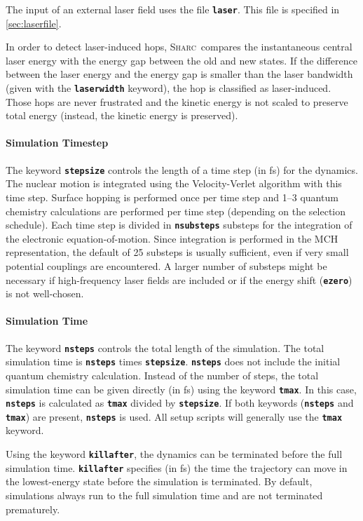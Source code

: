 \documentclass[a4paper,10pt,DIV=15,openany]{scrbook}
\newcommand{\sharc}{\textsc{Sharc}}
\newcommand{\ttt}[1]{\textbf{\texttt{#1}}}
\begin{document}
The input of an external laser field uses the file \ttt{laser}. This file is specified in \ref{sec:laserfile}.

In order to detect laser-induced hops, \sharc\ compares the instantaneous central laser energy with the energy gap between the old and new states. If the difference between the laser energy and the energy gap is smaller than the laser bandwidth (given with the \ttt{laserwidth} keyword), the hop is classified as laser-induced. Those hops are never frustrated and the kinetic energy is not scaled to preserve total energy (instead, the kinetic energy is preserved).

\paragraph{Simulation Timestep}

The keyword \ttt{stepsize} controls the length of a time step (in fs) for the dynamics. The nuclear motion is integrated using the Velocity-Verlet algorithm with this time step. Surface hopping is performed once per time step and 1--3 quantum chemistry calculations are performed per time step (depending on the selection schedule). Each time step is divided in \ttt{nsubsteps} substeps for the integration of the electronic equation-of-motion. Since integration is performed in the MCH representation, the default of 25 substeps is usually sufficient, even if very small potential couplings are encountered. A larger number of substeps might be necessary if high-frequency laser fields are included or if the energy shift (\ttt{ezero}) is not well-chosen.

\paragraph{Simulation Time}

The keyword \ttt{nsteps} controls the total length of the simulation. The total simulation time is \ttt{nsteps} times \ttt{stepsize}. \ttt{nsteps} does not include the initial quantum chemistry calculation. Instead of the number of steps, the total simulation time can be given directly (in fs) using the keyword \ttt{tmax}. In this case, \ttt{nsteps} is calculated as \ttt{tmax} divided by \ttt{stepsize}. If both keywords (\ttt{nsteps} and \ttt{tmax}) are present, \ttt{nsteps} is used. All setup scripts will generally use the \ttt{tmax} keyword.

Using the keyword \ttt{killafter}, the dynamics can be terminated before the full simulation time. \ttt{killafter} specifies (in fs) the time the trajectory can move in the lowest-energy state before the simulation is terminated. By default, simulations always run to the full simulation time and are not terminated prematurely.
\end{document}
